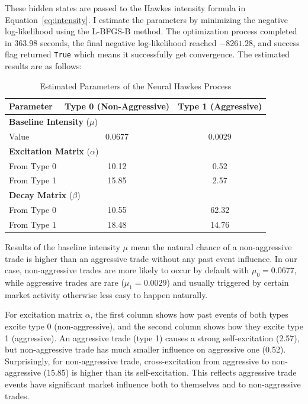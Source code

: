These hidden states are passed to the Hawkes intensity formula in Equation~\ref{eq:intensity}. I estimate the parameters by minimizing the negative log-likelihood using the L-BFGS-B method. The optimization process completed in 363.98 seconds, the final negative log-likelihood reached $-8261.28$, and success flag returned \texttt{True} which means it successfully get convergence. The estimated results are as follows:
\begin{table}[H]
    \centering
    \caption{Estimated Parameters of the Neural Hawkes Process}
    \label{tb:hawkes-params}
    \begin{tabular}{lcc}
    \toprule
    \textbf{Parameter} & \textbf{Type 0 (Non-Aggressive)} & \textbf{Type 1 (Aggressive)} \\
    \midrule
    \multicolumn{3}{l}{\textbf{Baseline Intensity} (\( \mu \))} \\
    \quad Value & 0.0677 & 0.0029 \\
    \midrule
    \multicolumn{3}{l}{\textbf{Excitation Matrix} (\( \alpha \))} \\
    \quad From Type 0 & 10.12 & 0.52 \\
    \quad From Type 1 & 15.85 & 2.57 \\
    \midrule
    \multicolumn{3}{l}{\textbf{Decay Matrix} (\( \beta \))} \\
    \quad From Type 0 & 10.55 & 62.32 \\
    \quad From Type 1 & 18.48 & 14.76 \\
    \bottomrule
    \end{tabular}
\end{table}

Results of the baseline intensity $\mu$ mean the natural chance of a non-aggressive trade is higher than an aggressive trade without any past event influence. In our case, non-aggressive trades are more likely to occur by default with $\mu_0 = 0.0677$, while aggressive trades are rare ($\mu_1 = 0.0029$) and usually triggered by certain market activity otherwise less easy to happen naturally.

For excitation matrix $\alpha$, the first column shows how past events of both types excite type 0 (non-aggressive), and the second column shows how they excite type 1 (aggressive). An aggressive trade (type 1) causes a strong self-excitation (2.57), but non-aggressive trade has much smaller influence on aggressive one (0.52). Surprisingly, for non-aggressive trade, cross-excitation from aggressive to non-aggressive (15.85) is higher than its self-excitation. This reflects aggressive trade events have significant market influence both to themselves and to non-aggressive trades.

